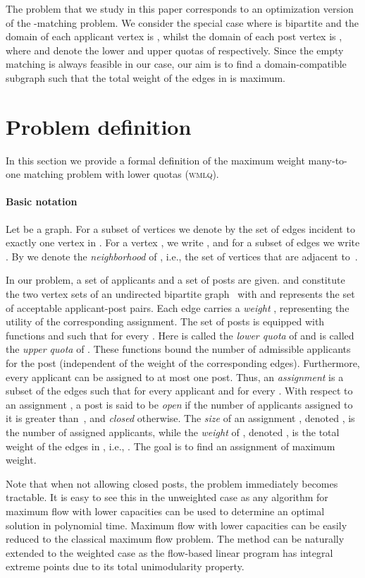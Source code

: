 \documentclass{llncs}
\begin{document}
The problem that we study in this paper corresponds to an optimization version of the -matching problem. We consider the special case where  is bipartite and the domain of each applicant vertex is , whilst the domain of each post vertex  is , where  and  denote the lower and upper quotas of  respectively.  Since the empty matching is always feasible in our case, our aim is to find a domain-compatible subgraph  such that the total weight of the edges in  is maximum.

\section{Problem definition}
\label{sec:probdef}
In this section we provide a formal definition of the maximum weight many-to-one matching problem with lower quotas (\textsc{wmlq}).

\paragraph{Basic notation}
Let  be a graph.
For a subset of vertices  we denote by  the set of edges incident to exactly one vertex in . For a vertex , we write , and for a subset of edges  we write .
By  we denote the \emph{neighborhood} of , i.e., the set of vertices that are adjacent to~.
\medskip

In our problem, a set of applicants  and a set of posts  are given.  and  constitute the two vertex sets of an undirected bipartite graph~ with  and  represents the set of acceptable applicant-post pairs. 
Each edge carries a \emph{weight} , representing the utility of the corresponding assignment. The set of posts is equipped with functions  and  such that  for every .  Here  is called the \emph{lower quota} of  and  is called the \emph{upper quota} of .  These functions bound the number of admissible applicants for the post (independent of the weight of the corresponding edges). Furthermore, every applicant can be assigned to at most one post.
Thus, an \emph{assignment} is a subset  of the edges such that  for every applicant  and  for every . With respect to an assignment , a post is said to be \emph{open} if the number of applicants assigned to it is greater than~, and \emph{closed} otherwise. The \emph{size} of an assignment , denoted , is the number of assigned applicants, while the \emph{weight} of , denoted , is the total weight of the edges in , i.e., . The goal is to find an assignment of maximum weight.
 
\begin{remark}
Note that when not allowing closed posts, the problem immediately becomes tractable. It is easy to see this in the unweighted case as any algorithm for maximum flow with lower capacities can be used to determine an optimal solution in polynomial time. Maximum flow with lower capacities can be easily reduced to the classical maximum flow problem. The method can be naturally extended to the weighted case as the flow-based linear program has integral extreme points due to its total unimodularity property.
\end{remark}
\end{document}
